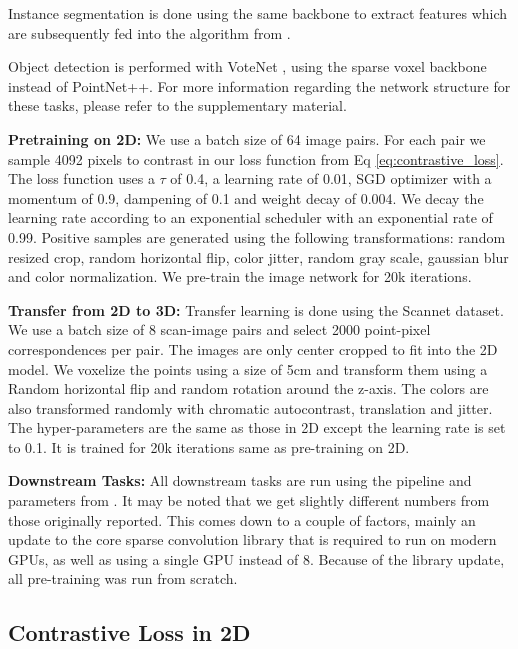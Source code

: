 \documentclass[10pt,twocolumn,letterpaper]{article}
\begin{document}
Instance segmentation is done using the same backbone to extract features which are subsequently fed into the algorithm from \cite{jiang2020pointgroup}.

Object detection is performed with VoteNet \cite{qi2019deep}, using the sparse voxel backbone instead of PointNet++. For more information regarding the network structure for these tasks, please refer to the supplementary material.

\textbf{Pretraining on 2D:} We use a batch size of 64 image pairs. For each pair we sample 4092 pixels to contrast in our loss function from Eq \ref{eq:contrastive_loss}. The loss function uses a $\tau$ of 0.4, a learning rate of 0.01, SGD optimizer with a momentum of 0.9, dampening of 0.1 and weight decay of 0.004. We decay the learning rate according to an exponential scheduler with an exponential rate of 0.99. Positive samples are generated using the following transformations: random resized crop, random horizontal flip, color jitter, random gray scale, gaussian blur and color normalization. We pre-train the image network for 20k iterations.

\textbf{Transfer from 2D to 3D:} Transfer learning is done using the Scannet dataset. We use a batch size of 8 scan-image pairs and select 2000 point-pixel correspondences per pair. The images are only center cropped to fit into the 2D model. We voxelize the points using a size of 5cm and transform them using a Random horizontal flip and random rotation around the z-axis. The colors are also transformed randomly with chromatic autocontrast, translation and jitter. The hyper-parameters are the same as those in 2D except the learning rate is set to 0.1. It is trained for 20k iterations same as pre-training on 2D.

\textbf{Downstream Tasks:} All downstream tasks are run using the pipeline and parameters from \cite{hou2021Exploring}. It may be noted that we get slightly different numbers from those originally reported. This comes down to a couple of factors, mainly an update to the core sparse convolution library that is required to run on modern GPUs, as well as using a single GPU instead of 8. Because of the library update, all pre-training was run from scratch.


\subsection{Contrastive Loss in 2D}
\label{sec:results:2d}
\end{document}

